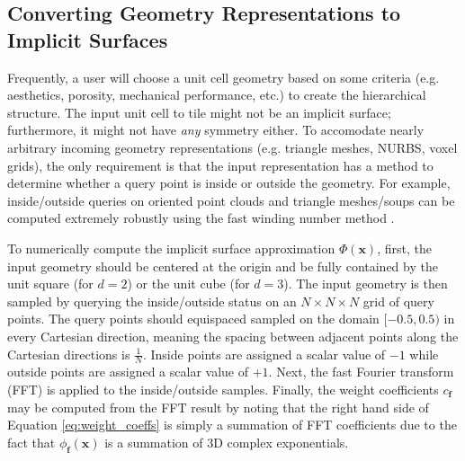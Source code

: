 \documentclass[acmtog]{acmart}
\begin{document}
\subsection{Converting Geometry Representations to Implicit Surfaces}

Frequently, a user will choose a unit cell geometry based on some criteria (e.g. aesthetics, porosity, mechanical performance, etc.) to create the hierarchical structure. The input unit cell to tile might not be an implicit surface; furthermore, it might not have \textit{any} symmetry either. To accomodate nearly arbitrary incoming geometry representations (e.g. triangle meshes, NURBS, voxel grids), the only requirement is that the input representation has a method to determine whether a query point is inside or outside the geometry. For example, inside/outside queries on oriented point clouds and triangle meshes/soups can be computed extremely robustly using the fast winding number method \cite{barill2018fast}.

To numerically compute the implicit surface approximation $\Phi(\mathbf{x})$, first, the input geometry should be centered at the origin and be fully contained by the unit square (for $d = 2$) or the unit cube (for $d = 3$). The input geometry is then sampled by querying the inside/outside status on an $N \times N \times N$ grid of query points. The query points should equispaced sampled on the domain $[-0.5, 0.5)$ in every Cartesian direction, meaning the spacing between adjacent points along the Cartesian directions is $\frac{1}{N}$. Inside points are assigned a scalar value of $-1$ while outside points are assigned a scalar value of $+1$. Next, the fast Fourier transform (FFT) is applied to the inside/outside samples. Finally, the weight coefficients $c_{\mathbf{f}}$ may be computed from the FFT result by noting that the right hand side of Equation \ref{eq:weight_coeffs} is simply a summation of FFT coefficients due to the fact that $\phi_{\mathbf{f}}(\mathbf{x})$ is a summation of 3D complex exponentials.
\end{document}
